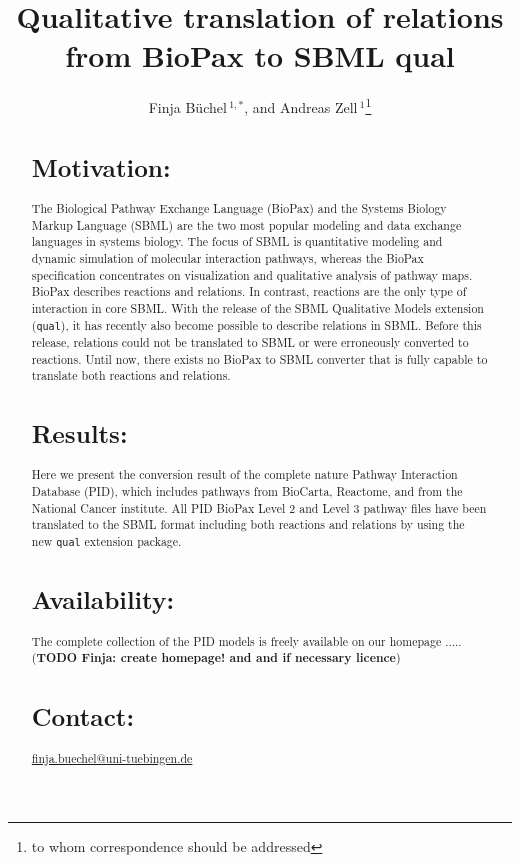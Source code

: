 \documentclass{bioinfo}
\newcommand{\qual}{\texttt{qual}}
\begin{document}

\title[BioPax to SBML qual]{Qualitative translation of relations from BioPax to SBML qual}
\author[B\"uchel \textit{et~al}]{Finja B\"uchel\,$^{1,*}$,
and Andreas Zell\,$^1$\footnote{to whom correspondence should be addressed}}
\address{$^{1}$Department of Cognitive Systems, University of Tuebingen, Sand 1,
72076 T\"ubingen, Germany}




\maketitle

\begin{abstract}

\section{Motivation:}
The Biological Pathway Exchange Language (BioPax) and the Systems Biology Markup Language (SBML) are the two most popular modeling and data exchange languages in systems biology.
The focus of SBML is quantitative modeling and dynamic simulation of molecular interaction pathways, whereas the BioPax specification concentrates on visualization and qualitative analysis of pathway maps.
BioPax describes reactions and relations. In contrast, reactions are the only type of interaction in core SBML.
With the release of the SBML Qualitative Models extension (\qual), it has recently also become possible to describe relations in SBML.
Before this release, relations could not be translated to SBML or were erroneously converted to reactions. Until now, there exists no BioPax to SBML converter that is fully capable to translate both reactions and relations.
\section{Results:}
Here we present the conversion result of the complete nature Pathway Interaction Database (PID), which includes pathways from BioCarta, Reactome, and from the National Cancer institute.
All PID BioPax Level 2 and Level 3 pathway files have been translated to the SBML format including both reactions and relations by using the new \qual{} extension package.
\section{Availability:}
The complete collection of the PID models is freely available on our homepage ..... (\textbf{TODO Finja: create homepage! and and if necessary licence})
\section{Contact:} \href{finja.buechel@uni-tuebingen.de}{finja.buechel@uni-tuebingen.de}
\end{abstract}
\end{document}
